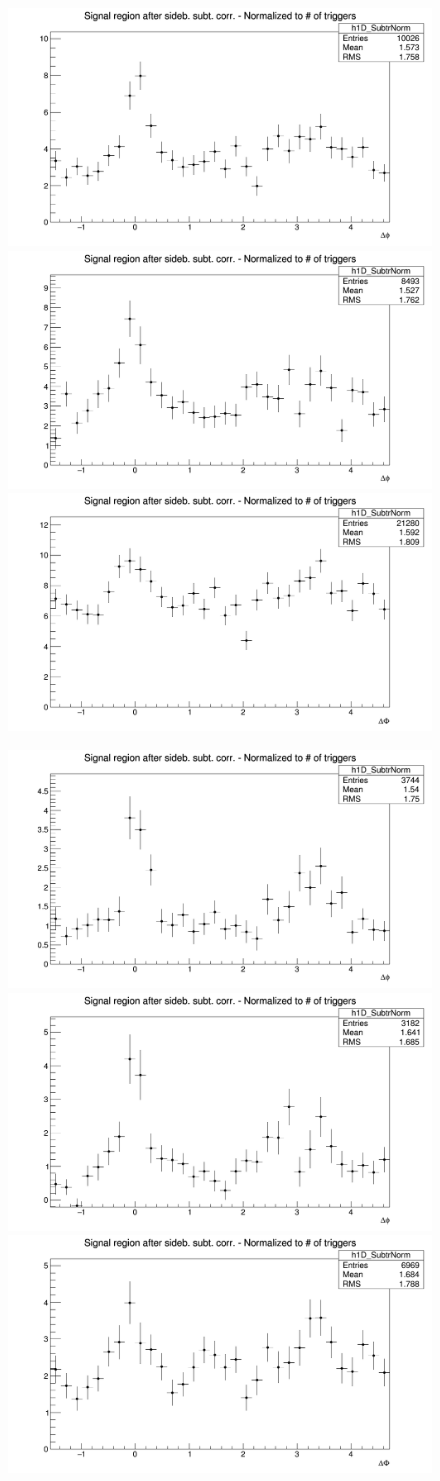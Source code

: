 \begin{figure}[!htbp]
{\includegraphics[width=0.31\linewidth, height=0.23\linewidth]{figures/Dzero/AzimCorrDistr_Dzero_Canvas_PtIntBins12to13_PoolInt_thrdot3to99dot.png}}
{\includegraphics[width=0.31\linewidth, height=0.23\linewidth]{figures/DplusPlotsweff/AzimCorrDistr_Dplus_Canvas_PtIntBins13to13_PoolInt_thrdot3to99dot.png}}
{\includegraphics[width=0.31\linewidth, height=0.23\linewidth]{figures/Dstar_wEFF/AzimCorrDistr_Dstar_Canvas_PtIntBins10to10_PoolInt_thrdot3to99dot.png}}

{\includegraphics[width=0.31\linewidth, height=0.23\linewidth]{figures/Dzero/AzimCorrDistr_Dzero_Canvas_PtIntBins12to13_PoolInt_thr1dotto99dot.png}}
{\includegraphics[width=0.31\linewidth, height=0.23\linewidth]{figures/DplusPlotsweff/AzimCorrDistr_Dplus_Canvas_PtIntBins13to13_PoolInt_thr1dotto99dot.png}}
{\includegraphics[width=0.31\linewidth, height=0.23\linewidth]{figures/Dstar_wEFF/AzimCorrDistr_Dstar_Canvas_PtIntBins10to10_PoolInt_thr1dotto99dot.png}}


\end{figure}
